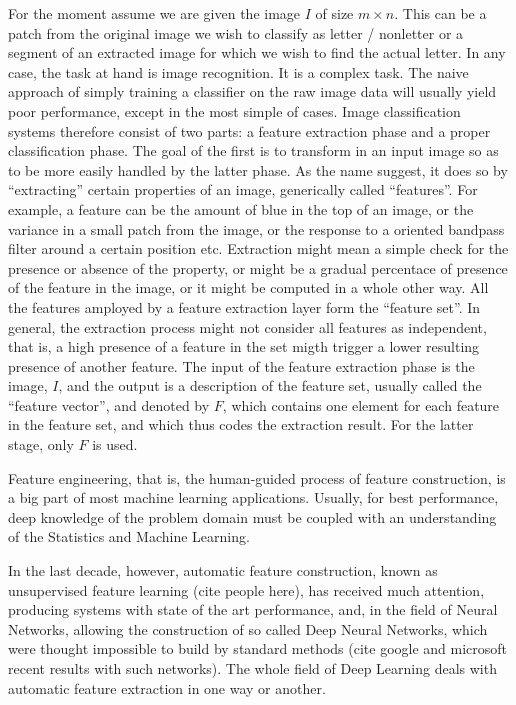\documentclass[12pt,a4paper,oneside,english]{UPBThesis}
\newcommand{\hctimes}[2]{{#1}\!\times\!{#2}}
\begin{document}
For the moment assume we are given the image $I$ of size $\hctimes{m}{n}$. This can be a patch from the original image we wish to classify as letter / nonletter or a segment of an extracted image for which we wish to find the actual letter. In any case, the task at hand is image recognition. It is a complex task. The naive approach of simply training a classifier on the raw image data will usually yield poor performance, except in the most simple of cases. Image classification systems therefore consist of two parts: a feature extraction phase and a proper classification phase. The goal of the first is to transform in an input image so as to be more easily handled by the latter phase. As the name suggest, it does so by ``extracting'' certain properties of an image, generically called ``features''. For example, a feature can be the amount of blue in the top of an image, or the variance in a small patch from the image, or the response to a oriented bandpass filter around a certain position etc. Extraction might mean a simple check for the presence or absence of the property, or might be a gradual percentace of presence of the feature in the image, or it might be computed in a whole other way. All the features amployed by a feature extraction layer form the ``feature set''. In general, the extraction process might not consider all features as independent, that is, a high presence of a feature in the set migth trigger a lower resulting presence of another feature. The input of the feature extraction phase is the image, $I$, and the output is a description of the feature set, usually called the ``feature vector'', and denoted by $F$, which contains one element for each feature in the feature set, and which thus codes the extraction result. For the latter stage, only $F$ is used.

Feature engineering, that is, the human-guided process of feature construction, is a big part of most machine learning applications. Usually, for best performance, deep knowledge of the problem domain must be coupled with an understanding of the Statistics and Machine Learning.

In the last decade, however, automatic feature construction, known as unsupervised feature learning (cite people here), has received much attention, producing systems with state of the art performance, and, in the field of Neural Networks, allowing the construction of so called Deep Neural Networks, which were thought impossible to build by standard methods (cite google and microsoft recent results with such networks). The whole field of Deep Learning deals with automatic feature extraction in one way or another.
\end{document}
